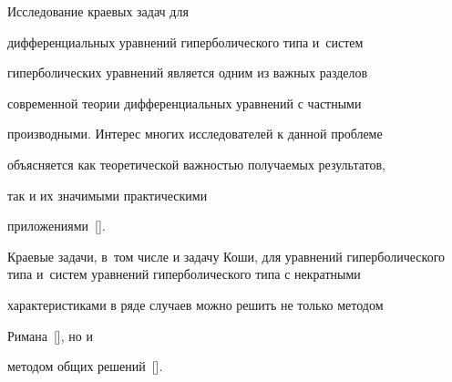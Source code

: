 
\date{}








\renewcommand{\JournalDataOnline}{\displaydate{andreyakoe}}



\vspace{5mm}




\makerutitle



\newpage







 Исследование краевых задач для

дифференциальных уравнений гиперболического типа и~систем

гиперболических уравнений  является одним из важных разделов

современной теории дифференциальных уравнений с частными

производными. Интерес многих исследователей к данной проблеме

объясняется как теоретической важностью получаемых результатов,

так и их значимыми практическими

приложениями~[]. 

Краевые задачи, в~том числе и задачу Коши, для уравнений гиперболического типа и~систем уравнений  гиперболического типа с некратными

характеристиками в ряде случаев можно решить не только методом

Римана~[], но и

методом общих решений~[].



\smallskip



